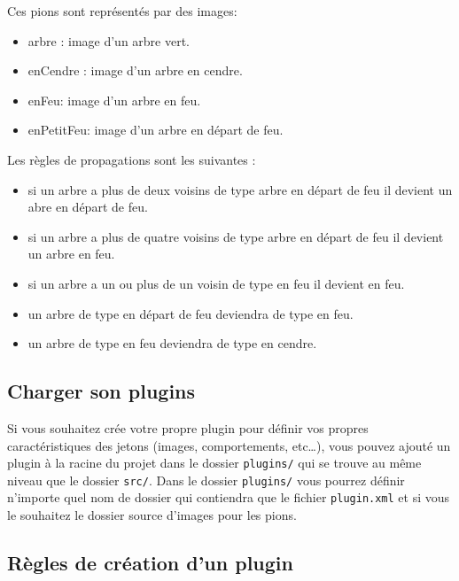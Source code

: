 \documentclass[pdftex,12pt,a4paper]{article}
\newcommand{\commande}[1]{\texttt{#1}}
\begin{document}
\noindent Ces pions sont représentés par des images:
    
        \begin{itemize}
        	\item arbre : image d'un arbre vert.
            \item enCendre : image d'un arbre en cendre.
            \item enFeu: image d'un arbre en feu.
            \item enPetitFeu: image d'un arbre en départ de feu.\\
        \end{itemize} 
        
\noindent  Les règles de propagations sont les suivantes : 
  
        \begin{itemize}
        	\item si un arbre a plus de deux voisins de type  arbre en départ de feu il devient un abre en départ de feu.
            \item si un arbre a plus de quatre voisins de type arbre en départ de feu il devient un arbre en feu. 
            \item si un arbre a un ou plus de un voisin de type  en feu il devient en feu. 
            \item un arbre de type en départ de feu deviendra de type en feu.
			\item un arbre de type en feu deviendra de type en cendre.
			\end{itemize} 
        
        \newpage
       \subsection{Charger son plugins}
       
      Si vous souhaitez crée votre propre plugin pour définir vos propres caractéristiques des jetons (images, comportements, etc\dots), vous pouvez ajouté un plugin à la racine du projet dans le dossier \commande{plugins/} qui se trouve au même niveau que le dossier \commande{src/}. Dans le dossier \commande{plugins/} vous pourrez définir n'importe quel nom de dossier qui contiendra  que le fichier \commande{plugin.xml} et si vous le souhaitez le dossier source d'images pour les pions.
      
      
      \subsection{Règles de création d'un plugin}
      
\end{document}
